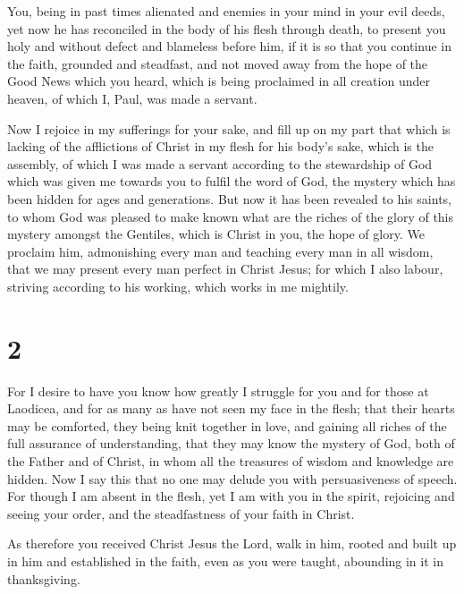  You, being in past times alienated and enemies in your
mind in your evil deeds,  yet now he has reconciled in the
body of his flesh through death, to present you holy and without defect
and blameless before him,  if it is so that you continue in
the faith, grounded and steadfast, and not moved away from the hope of
the Good News which you heard, which is being proclaimed in all creation
under heaven, of which I, Paul, was made a servant.

 Now I rejoice in my sufferings for your sake, and fill up
on my part that which is lacking of the afflictions of Christ in my
flesh for his body's sake, which is the assembly,  of which
I was made a servant according to the stewardship of God which was given
me towards you to fulfil the word of God,  the mystery
which has been hidden for ages and generations. But now it has been
revealed to his saints,  to whom God was pleased to make
known what are the riches of the glory of this mystery amongst the
Gentiles, which is Christ in you, the hope of glory.  We
proclaim him, admonishing every man and teaching every man in all
wisdom, that we may present every man perfect in Christ Jesus;
 for which I also labour, striving according to his
working, which works in me mightily.

\hypertarget{section-1}{%
\section{2}\label{section-1}}

 For I desire to have you know how greatly I struggle for
you and for those at Laodicea, and for as many as have not seen my face
in the flesh;  that their hearts may be comforted, they
being knit together in love, and gaining all riches of the full
assurance of understanding, that they may know the mystery of God, both
of the Father and of Christ,  in whom all the treasures of
wisdom and knowledge are hidden.  Now I say this that no one
may delude you with persuasiveness of speech.  For though I
am absent in the flesh, yet I am with you in the spirit, rejoicing and
seeing your order, and the steadfastness of your faith in Christ.

 As therefore you received Christ Jesus the Lord, walk in
him,  rooted and built up in him and established in the
faith, even as you were taught, abounding in it in thanksgiving.

